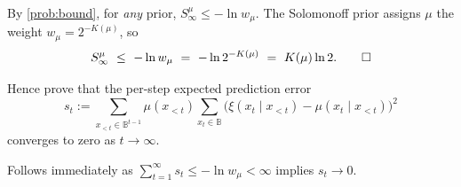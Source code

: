 \documentclass[fontsize=11pt, parskip=half]{scrartcl}
\begin{document}
\begin{solution}
By \cref{prob:bound}, for \emph{any} prior, $S_{\infty}^{\mu} \leq -\ln w_\mu$. The Solomonoff prior assigns $\mu$ the weight $w_\mu = 2^{-K(\mu)}$, so
\[
S_{\infty}^{\mu} ~\leq~ -\ln w_\mu ~=~ -\ln 2^{-K(\mu)} ~=~ K(\mu) \ln 2. \qedhere
\]
\end{solution}

\begin{exercise}
\label{prob:per-step_error}



Hence prove that the per-step expected prediction error
\[
s_t := \sum_{x_{<t} \in \mathbb{B}^{t-1}} \mu(x_{<t}) \sum_{x_t \in \mathbb{B}} \big( \xi(x_t \mid x_{<t}) - \mu(x_t \mid x_{<t}) \big)^2
\]
converges to zero as $t \to \infty$.
\end{exercise}

\begin{solution}
    Follows immediately as $\sum_{t=1}^\infty s_t \leq -\ln w_\mu < \infty$ implies $s_t \to 0$.
\end{solution}






\end{document}
